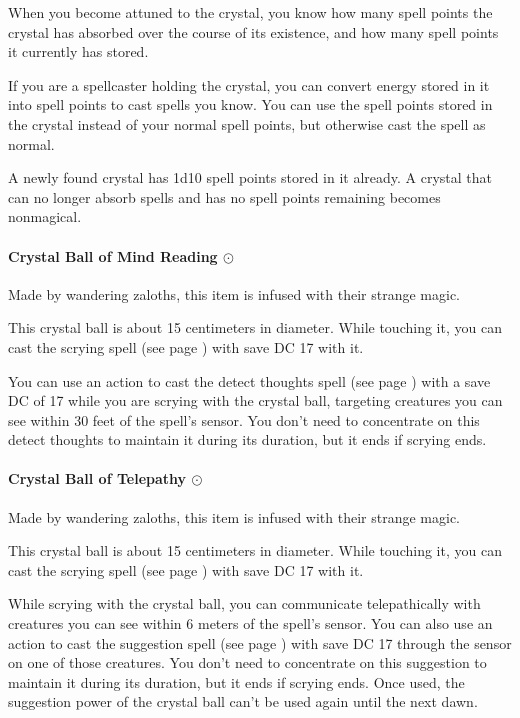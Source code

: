         When you become attuned to the crystal, you know how many spell points the crystal has absorbed over the course of its existence, and how many spell points it currently has stored.

        If you are a spellcaster holding the crystal, you can convert energy stored in it into spell points to cast spells you know.
        You can use the spell points stored in the crystal instead of your normal spell points, but otherwise cast the spell as normal.

        A newly found crystal has 1d10 spell points stored in it already.
        A crystal that can no longer absorb spells and has no spell points remaining becomes nonmagical.
    \paragraph{Crystal Ball of Mind Reading $\odot$}
        Made by wandering zaloths, this item is infused with their strange magic.

        This crystal ball is about 15 centimeters in diameter.
        While touching it, you can cast the scrying spell (see page \pageref{spell::scrying}) with save DC 17 with it.

        You can use an action to cast the detect thoughts spell (see page \pageref{spell::detectthoughts}) with a save DC of 17 while you are scrying with the crystal ball, targeting creatures you can see within 30 feet of the spell's sensor.
        You don't need to concentrate on this detect thoughts to maintain it during its duration, but it ends if scrying ends.
    \paragraph{Crystal Ball of Telepathy $\odot$}
        Made by wandering zaloths, this item is infused with their strange magic.

        This crystal ball is about 15 centimeters in diameter.
        While touching it, you can cast the scrying spell (see page \pageref{spell::scrying}) with save DC 17 with it.

        While scrying with the crystal ball, you can communicate telepathically with creatures you can see within 6 meters of the spell's sensor.
        You can also use an action to cast the suggestion spell (see page \pageref{spell::suggestion}) with save DC 17 through the sensor on one of those creatures.
        You don't need to concentrate on this suggestion to maintain it during its duration, but it ends if scrying ends.
        Once used, the suggestion power of the crystal ball can't be used again until the next dawn.
